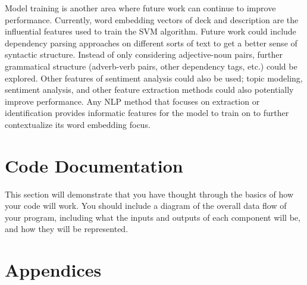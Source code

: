 \documentclass[10pt,twocolumn]{article}
\begin{document}
Model training is another area where future work can continue to improve performance. Currently, word embedding vectors of deck and description are the influential features used to train the SVM algorithm. Future work could include dependency parsing approaches on different sorts of text to get a better sense of syntactic structure. \cite{LDiCaro} Instead of only considering adjective-noun pairs, further grammatical structure (adverb-verb pairs, other dependency tags, etc.) could be explored. Other features of sentiment analysis could also be used; topic modeling, sentiment analysis, and other feature extraction methods could also potentially improve performance. \cite{Ramzan, Ryan_51} Any NLP method that focuses on extraction or identification provides informatic features for the model to train on to further contextualize its word embedding focus.

\section{Code Documentation}

This section will demonstrate that you have thought through the basics of how your code will work. You should include a diagram of the overall data flow of your program, including what the inputs and outputs of each component will be, and how they will be represented.





\section{Appendices}

\printbibliography
\end{document}
